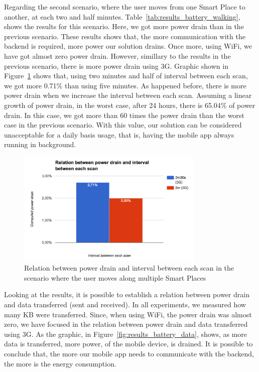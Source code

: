 Regarding the second scenario, where the user moves from one Smart Place to another, at each two and half minutes.
Table~\ref{tab:results_battery_walking}, shows the results for this scenario. Here, we got more power drain than in the previous scenario.
These results shows that, the more communication with the backend is required, more power our solution drains.
Once more, using \gls{WiFi}, we have got almost zero power drain.
However, simillary to the results in the previous scenario, there is more power drain using \gls{3G}.
Graphic shown in Figure~\ref{fig:results_battery_walking} shows that, using two minutes and half of interval between each scan, we got more 0.71\% than using five minutes.
As happened before, there is more power drain when we increase the interval between each scan.
Assuming a linear growth of power drain, in the worst case, after 24 hours, there is 65.04\% of power drain.
In this case, we got more than 60 times the power drain than the worst case in the previous scenario.
With this value, our solution can be considered unacceptable for a daily basis usage, that is, having the mobile app always running in background.



\begin{figure}[!ht]
  \centering
    \includegraphics[width=0.8\textwidth, keepaspectratio]{images/results_battery_walking}
    \caption[Power drain when the user is moving]{Relation between power drain and interval between each scan in the scenario where the user moves along multiple Smart Places}
    \label{fig:results_battery_walking}
\end{figure}

Looking at the results, it is possible to establish a relation between power drain and data transferred (sent and received).
In all experiments, we measured how many \gls{KB} were transferred.
Since, when using \gls{WiFi}, the power drain was almost zero, we have focused in the relation between power drain and data transferred using \gls{3G}.
As the graphic, in Figure~\ref{fig:results_battery_data}, shows, as more data is transferred, more power, of the mobile device, is drained.
It is possible to conclude that, the more our mobile app needs to communicate with the backend, the more is the energy consumption.

